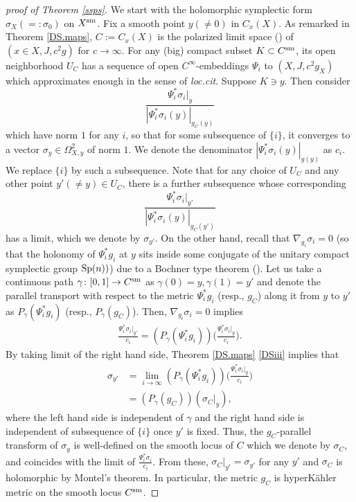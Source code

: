 \documentclass[12pt,a4paper]{amsart}
\theoremstyle{remark}
\theoremstyle{definition}
\begin{document}
\begin{proof}[proof of Theorem \ref{ssps}]
We start with the 
holomorphic symplectic form $\sigma_X(=:\sigma_0)$ on $X^{\rm sm}$. 
Fix a smooth point $y(\neq 0)$ in $C_x(X)$. 
As remarked in Theorem \ref{DS.maps}, 
$C := C_x(X)$ is the polarized limit space (\cite[p330]{DSII}) of 
$(x\in X,J,c^2 g)$ for $c\to \infty$. For any (big)  compact subset $K\subset C^{\rm sm}$, its open neighborhood $U_C$ has a sequence of 
open $C^{\infty}$-embeddings 
$\Psi_i$ to $(X,J,c^2g_X)$ which approximates enough 
in the sense of {\it loc.cit}. 
Suppose $K\ni y$. 
Then consider 
$$\frac{\Psi_i^* \sigma_i|_y}{|\Psi_i^* 
\sigma_i(y)|_{g_C(y)}}$$ 
which have norm $1$ for any $i$, so that for some 
subsequence of $\{i\}$, 
it converges to a vector $\sigma_y \in 
\Omega^2_{X,y}$ of norm $1$. 
We denote the  denominator 
${|\Psi_i^* 
\sigma_i(y)|_{g(y)}}$ as $c_i$. 
We replace  $\{i\}$ by such a subsequence. 
Note that for any choice of $U_C$ and any 
other point $y'(\neq y)\in U_C$, 
there is a further subsequence whose corresponding 
$$\frac{\Psi_i^* \sigma_i|_{y'}}{|\Psi_i^* \sigma_i(y)|_{g_C(y')}}$$ has a limit, which we denote 
by $\sigma_{y'}$. 
On the other hand, 
recall that 
$\nabla_{g_i}\sigma_i=0$ (so that the holonomy of $\Psi_i^* g_i$ at $y$ 
sits inside some conjugate of the unitary compact symplectic group ${\rm Sp}(n))$)  due to a Bochner type theorem  (\cite[Theorem A]{Henri.etc}). 
Let us take a continuous  
path $\gamma\colon [0,1]\to C^{\rm sm}$ as  $\gamma(0)=y, \gamma(1)=y'$ and 
denote the parallel transport 
with respect to the metric $\Psi_i^* g_i$ 
(resp., $g_C$) 
along it from $y$ to $y'$ as 
$P_\gamma(\Psi_i^* g_i)$ (resp., $P_\gamma(g_C)$). 
Then, $\nabla_{g_i}\sigma_i=0$ implies 
\begin{align}\label{par.tr}
\frac{\Psi_i^* \sigma_i|_{y'}}{c_i}=
(P_\gamma(\Psi_i^* g_i))\biggl(\frac{\Psi_i^* \sigma_i|_y}{c_i}\biggr). 
\end{align}
By taking limit of the right hand side, 
Theorem \ref{DS.maps} \eqref{DSiii}  
implies that 
\begin{align}
\sigma_{y'}&=\lim_{i\to \infty} (P_\gamma(\Psi_i^* g_i))\biggl(\frac{\Psi_i^* \sigma_i|_y}{c_i}\biggr) \\
&=(P_\gamma(g_C))(\sigma_C|_y), 
\end{align}
where the left hand side is independent of $\gamma$ 
and the right hand side is independent of  
subsequence of $\{i\}$ once $y'$ is fixed. 
Thus, the 
$g_C$-parallel 
transform of 
$\sigma_y$ 
is well-defined 
on the smooth locus of $C$ 
which we denote by $\sigma_C$, 
and coincides with the limit of 
$\frac{\Psi_i^* \sigma_i}{c_i}$. 
From these, $\sigma_C|_{y'}=\sigma_{y'}$ for any 
$y'$ 
and $\sigma_C$ is holomorphic by 
Montel's theorem. In particular, 
the metric $g_C$ is hyperK\"ahler metric 
on the smooth locus $C^{\rm sm}$. 


\end{proof}
\end{document}
